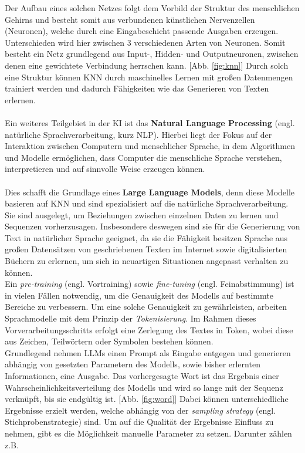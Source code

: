 Der Aufbau eines solchen Netzes folgt dem Vorbild der Struktur des menschlichen Gehirns und besteht somit aus verbundenen künstlichen Nervenzellen (Neuronen), welche durch eine Eingabeschicht passende Ausgaben erzeugen. \cite*{morrKuNstlicheNeuronale} Unterschieden wird hier zwischen 3 verschiedenen Arten von Neuronen. Somit besteht ein Netz grundlegend aus Input-, Hidden- und Outputneuronen, zwischen denen eine gewichtete Verbindung herrschen kann. \cite*{NeuronaleNetzeEinfuhrung} [Abb. \ref{fig:knn}] Durch solch eine Struktur können KNN durch maschinelles Lernen mit großen Datenmengen trainiert werden und dadurch Fähigkeiten wie das Generieren von Texten erlernen. \cite*{seemannKuenstlicheIntelligenzLarge}\\\\ Ein weiteres Teilgebiet in der KI ist das \textbf{Natural Language Processing} (engl. natürliche Sprachverarbeitung, kurz NLP). Hierbei liegt der Fokus auf der Interaktion zwischen Computern und menschlicher Sprache, in dem Algorithmen und Modelle ermöglichen, dass Computer die menschliche Sprache verstehen, interpretieren und auf sinnvolle Weise erzeugen können. \cite*{muruganNaturalLanguageProcessing2024} \\\\ Dies schafft die Grundlage eines \textbf{Large Language Models}, denn diese Modelle basieren auf KNN und sind spezialisiert auf die natürliche Sprachverarbeitung. \cite*{seemannKuenstlicheIntelligenzLarge} Sie sind ausgelegt, um Beziehungen zwischen einzelnen Daten zu lernen und Sequenzen vorherzusagen. Insbesondere deswegen sind sie für die Generierung von Text in natürlicher Sprache geeignet, da sie die Fähigkeit besitzen Sprache aus großen Datensätzen von geschriebenen Texten im Internet sowie digitalisierten Büchern zu erlernen, um sich in neuartigen Situationen angepasst verhalten zu können. \cite*{okerlundWhatChatterbox2022} \cite*{authorityofthehouseoflordsLargeLanguageModels} \\Ein \textit{pre-training} (engl. Vortraining) sowie \textit{fine-tuning} (engl. Feinabstimmung) ist in vielen Fällen notwendig, um die Genauigkeit des Modells auf bestimmte Bereiche zu verbessern. \cite{HowLLMsWork} Um eine solche Genauigkeit zu gewährleisten, arbeiten Sprachmodelle mit dem Prinzip der \textit{Tokenisierung}. Im Rahmen dieses Vorverarbeitungsschritts erfolgt eine Zerlegung des Textes in Token, wobei diese aus Zeichen, Teilwörtern oder Symbolen bestehen können. \cite*{naveedComprehensiveOverviewLarge2024} \\ Grundlegend nehmen LLMs einen Prompt als Eingabe entgegen und generieren abhängig von gesetzten Parametern des Modells, sowie bisher erlernten Informationen, eine Ausgabe.  Das vorhergesagte Wort ist das Ergebnis einer Wahrscheinlichkeitsverteilung des Modells und wird so lange mit der Sequenz verknüpft, bis sie endgültig ist. [Abb. \ref{fig:word}] Dabei können unterschiedliche Ergebnisse erzielt werden, welche abhängig von der \textit{sampling strategy} (engl. Stichprobenstrategie) sind. \cite*{cholletDeepLearningPython2018} Um auf die Qualität der Ergebnisse Einfluss zu nehmen, gibt es die Möglichkeit manuelle Parameter zu setzen. Darunter zählen z.B. 